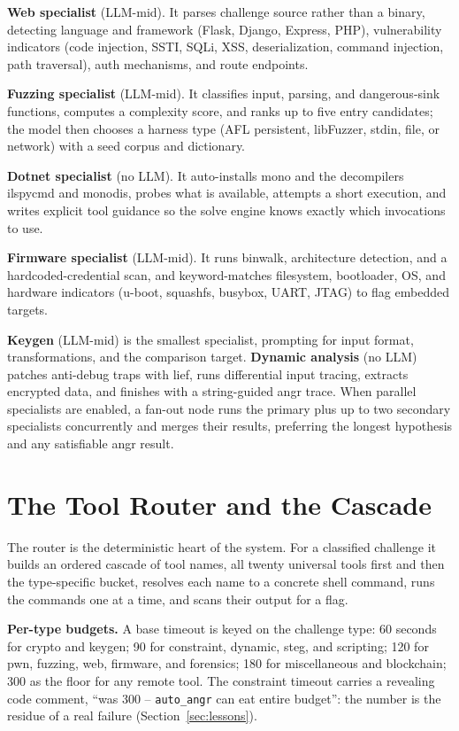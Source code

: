 \documentclass[10pt,twocolumn]{article}
\begin{document}
\medskip
\textbf{Web specialist} (LLM-mid). It parses challenge source rather than a binary, detecting language
and framework (Flask, Django, Express, PHP), vulnerability indicators (code injection, SSTI, SQLi, XSS,
deserialization, command injection, path traversal), auth mechanisms, and route endpoints.

\medskip
\textbf{Fuzzing specialist} (LLM-mid). It classifies input, parsing, and dangerous-sink functions,
computes a complexity score, and ranks up to five entry candidates; the model then chooses a harness
type (AFL persistent, libFuzzer, stdin, file, or network) with a seed corpus and dictionary.

\medskip
\textbf{Dotnet specialist} (no LLM). It auto-installs mono and the decompilers ilspycmd and monodis,
probes what is available, attempts a short execution, and writes explicit tool guidance so the solve
engine knows exactly which invocations to use.

\medskip
\textbf{Firmware specialist} (LLM-mid). It runs binwalk, architecture detection, and a
hardcoded-credential scan, and keyword-matches filesystem, bootloader, OS, and hardware indicators
(u-boot, squashfs, busybox, UART, JTAG) to flag embedded targets.

\medskip
\textbf{Keygen} (LLM-mid) is the smallest specialist, prompting for input format, transformations, and
the comparison target. \textbf{Dynamic analysis} (no LLM) patches anti-debug traps with lief, runs
differential input tracing, extracts encrypted data, and finishes with a string-guided angr trace. When
parallel specialists are enabled, a fan-out node runs the primary plus up to two secondary specialists
concurrently and merges their results, preferring the longest hypothesis and any satisfiable angr
result.

\section{The Tool Router and the Cascade}
\label{sec:router}

The router is the deterministic heart of the system. For a classified challenge it builds an ordered
cascade of tool names, all twenty universal tools first and then the type-specific bucket, resolves each
name to a concrete shell command, runs the commands one at a time, and scans their output for a flag.

\medskip
\textbf{Per-type budgets.} A base timeout is keyed on the challenge type: 60 seconds for crypto and
keygen; 90 for constraint, dynamic, steg, and scripting; 120 for pwn, fuzzing, web, firmware, and
forensics; 180 for miscellaneous and blockchain; 300 as the floor for any remote tool. The constraint
timeout carries a revealing code comment, ``was 300 -- \texttt{auto\_angr} can eat entire budget'': the
number is the residue of a real failure (Section~\ref{sec:lessons}).
\end{document}
